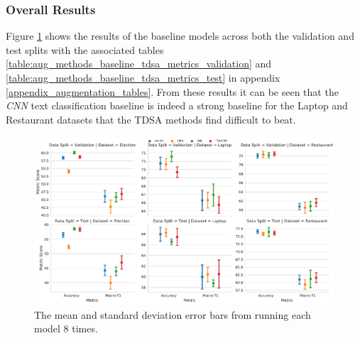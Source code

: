 \FloatBarrier
\subsubsection{Overall Results}
Figure \ref{fig:aug_baseline_overall_scores} shows the results of the baseline models across both the validation and test splits with the associated tables \ref{table:aug_methods_baseline_tdsa_metrics_validation} and \ref{table:aug_methods_baseline_tdsa_metrics_test} in appendix \ref{appendix_augmentation_tables}. From these results it can be seen that the \textit{CNN} text classification baseline is indeed a strong baseline for the Laptop and Restaurant datasets that the TDSA methods find difficult to beat. 

\begin{figure}[ht!]
    \centering
    \includegraphics[scale=0.4]{images/augmentation/methods_performance/baseline/baseline_overall_scores.pdf}
    \caption{The mean and standard deviation error bars from running each model 8 times.}
    \label{fig:aug_baseline_overall_scores}
\end{figure}

\FloatBarrier
